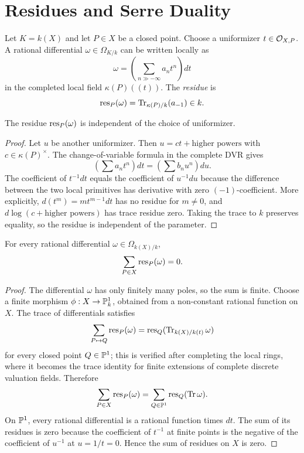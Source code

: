 \section{Residues and Serre Duality}

\begin{definition}
Let \(K=k(X)\) and let \(P\in X\) be a closed point.  Choose a uniformizer
\(t\in\mathcal{O}_{X,P}\).  A rational differential \(\omega\in\Omega_{K/k}\) can be
written locally as
\[
    \omega=\left(\sum_{n\gg-\infty} a_n t^n\right)dt
\]
in the completed local field \(\kappa(P)((t))\).  The \emph{residue} is
\[
    \operatorname{res}_P(\omega)=\operatorname{Tr}_{\kappa(P)/k}(a_{-1})\in k.
\]
\end{definition}

\begin{proposition}
The residue \(\operatorname{res}_P(\omega)\) is independent of the choice of uniformizer.
\end{proposition}

\begin{proof}
Let \(u\) be another uniformizer.  Then \(u=ct+\text{higher powers}\) with
\(c\in\kappa(P)^\times\).  The change-of-variable formula in the complete DVR
gives
\[
    \left(\sum a_n t^n\right)dt
    =
    \left(\sum b_n u^n\right)du.
\]
The coefficient of \(t^{-1}dt\) equals the coefficient of \(u^{-1}du\) because
the difference between the two local primitives has derivative with zero
\((-1)\)-coefficient.  More explicitly, \(d(t^m)=m t^{m-1}dt\) has no residue
for \(m\ne0\), and \(d\log(c+\text{higher powers})\) has trace residue zero.
Taking the trace to \(k\) preserves equality, so the residue is independent of
the parameter.
\end{proof}

\begin{theorem}
For every rational differential \(\omega\in\Omega_{k(X)/k}\),
\[
    \sum_{P\in X}\operatorname{res}_P(\omega)=0.
\]
\end{theorem}

\begin{proof}
The differential \(\omega\) has only finitely many poles, so the sum is finite.
Choose a finite morphism \(\phi:X\to\mathbb{P}^1_k\), obtained from a non-constant
rational function on \(X\).  The trace of differentials satisfies
\[
    \sum_{P\mapsto Q}\operatorname{res}_P(\omega)=\operatorname{res}_Q(\operatorname{Tr}_{k(X)/k(t)}\omega)
\]
for every closed point \(Q\in\mathbb{P}^1\); this is verified after completing the
local rings, where it becomes the trace identity for finite extensions of
complete discrete valuation fields.  Therefore
\[
    \sum_{P\in X}\operatorname{res}_P(\omega)
    =
    \sum_{Q\in\mathbb{P}^1}\operatorname{res}_Q(\operatorname{Tr}\omega).
\]
On \(\mathbb{P}^1\), every rational differential is a rational function times \(dt\).
The sum of its residues is zero because the coefficient of \(t^{-1}\) at finite
points is the negative of the coefficient of \(u^{-1}\) at \(u=1/t=0\).  Hence
the sum of residues on \(X\) is zero.
\end{proof}

